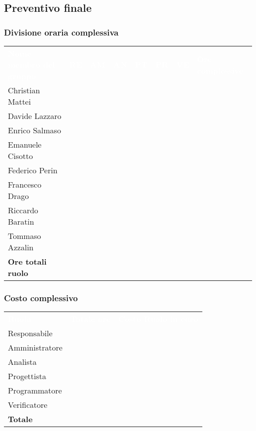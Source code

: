 \subsection{Preventivo finale}
\subsubsection{Divisione oraria complessiva}
{
	\renewcommand{\arraystretch}{2}
	\centering
	\begin{longtable}{ C{5cm} C{1cm} C{1cm} C{1cm} C{1cm} C{1cm} C{1cm} C{3cm}}
		\textcolor{white}{\textbf{Nome membro del gruppo}} & \textcolor{white}{\textbf{RE}} & \textcolor{white}{\textbf{AM}} & \textcolor{white}{\textbf{AN}} & \textcolor{white}{\textbf{PT}} & \textcolor{white}{\textbf{PR}} & \textcolor{white}{\textbf{VE}} & \textcolor{white}{\textbf{Ore complessive}}\\	
        
        Christian Mattei & & & & & & & \\
        Davide Lazzaro & & & & & & & \\
        Enrico Salmaso & & & & & & & \\
        Emanuele Cisotto & & & & & & & \\
        Federico Perin & & & & & & & \\
        Francesco Drago & & & & & & & \\
        Riccardo Baratin & & & & & & & \\
        Tommaso Azzalin & & & & & & & \\
        \textbf{Ore totali ruolo} & & & & & & & \\
		
	\end{longtable}
}
\subsubsection{Costo complessivo}
{
	\renewcommand{\arraystretch}{2}
	\centering
	\begin{longtable}{ C{3cm} C{2cm} C{4cm}}
		\textcolor{white}{\textbf{Ruolo}} & \textcolor{white}{\textbf{Totale ore}} & \textcolor{white}{\textbf{Costo Ruolo in euro}}\\	
        
        Responsabile & & \\
        Amministratore & & \\
        Analista & & \\
         Progettista & & \\
        Programmatore & & \\
        Verificatore & & \\
        \textbf{Totale} & & \\
		
	\end{longtable}
}


